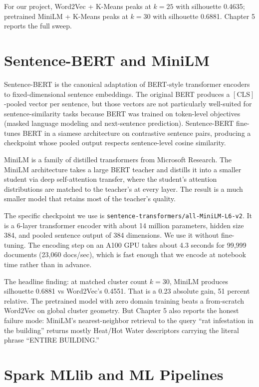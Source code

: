 \documentclass[11pt,letterpaper]{book}
\begin{document}
For our project, Word2Vec + K-Means peaks at $k = 25$ with silhouette 0.4635; pretrained MiniLM + K-Means peaks at $k = 30$ with silhouette 0.6881. Chapter 5 reports the full sweep.

\section{Sentence-BERT and MiniLM}

Sentence-BERT \cite{reimers2019} is the canonical adaptation of BERT-style transformer encoders to fixed-dimensional sentence embeddings. The original BERT produces a $[\mathrm{CLS}]$-pooled vector per sentence, but those vectors are not particularly well-suited for sentence-similarity tasks because BERT was trained on token-level objectives (masked language modeling and next-sentence prediction). Sentence-BERT fine-tunes BERT in a siamese architecture on contrastive sentence pairs, producing a checkpoint whose pooled output respects sentence-level cosine similarity.

MiniLM \cite{wang2020minilm} is a family of distilled transformers from Microsoft Research. The MiniLM architecture takes a large BERT teacher and distills it into a smaller student via deep self-attention transfer, where the student's attention distributions are matched to the teacher's at every layer. The result is a much smaller model that retains most of the teacher's quality.

The specific checkpoint we use is \texttt{sentence-transformers/all-MiniLM-L6-v2}. It is a 6-layer transformer encoder with about 14 million parameters, hidden size 384, and pooled sentence output of 384 dimensions. We use it without fine-tuning. The encoding step on an A100 GPU takes about 4.3 seconds for 99,999 documents (23,060 docs/sec), which is fast enough that we encode at notebook time rather than in advance.

The headline finding: at matched cluster count $k = 30$, MiniLM produces silhouette 0.6881 vs Word2Vec's 0.4551. That is a 0.23 absolute gain, 51 percent relative. The pretrained model with zero domain training beats a from-scratch Word2Vec on global cluster geometry. But Chapter 5 also reports the honest failure mode: MiniLM's nearest-neighbor retrieval to the query ``rat infestation in the building'' returns mostly Heat/Hot Water descriptors carrying the literal phrase ``ENTIRE BUILDING.''

\section{Spark MLlib and ML Pipelines}
\end{document}
